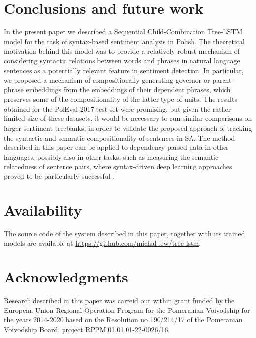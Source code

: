 \documentclass[10pt, a4paper]{article}
\begin{document}
\section{Conclusions and future work}

In the present paper we described a Sequential Child-Combination Tree-LSTM model for the task of syntax-based sentiment analysis in Polish. The theoretical motivation behind this model was to provide a relatively robust mechanism of considering syntactic relations between words and phrases in natural language sentences as a potentially relevant feature in sentiment detection. In particular, we proposed a mechanism of compositionally generating governor or parent-phrase embeddings from the embeddings of their dependent phrases, which preserves some of the compositionality of the latter type of units. The results obtained for the PolEval 2017 test set were promising, but given the rather limited size of these datasets, it would be necessary to run similar comparisons on larger sentiment treebanks, in order to validate the proposed approach of tracking the syntactic and semantic compositionality of sentences in SA. The method described in this paper can be applied to dependency-parsed data in other languages, possibly also in other tasks, such as measuring the semantic relatedness of sentence pairs, where syntax-driven deep learning approaches proved to be particularly successful \cite{tai2015improved}.
\section{Availability}

The source code of the system described in this paper, together with its trained models are available at \url{https://github.com/michal-lew/tree-lstm}.


\section{Acknowledgments}

Research described in this paper was carreid out within grant funded
by the European Union Regional Operation Program for
the Pomeranian Voivodship for the years 2014-2020 based on
the Resolution no 190/214/17 of the Pomeranian Voivodship
Board, project RPPM.01.01.01-22-0026/16.


 
\end{document}
